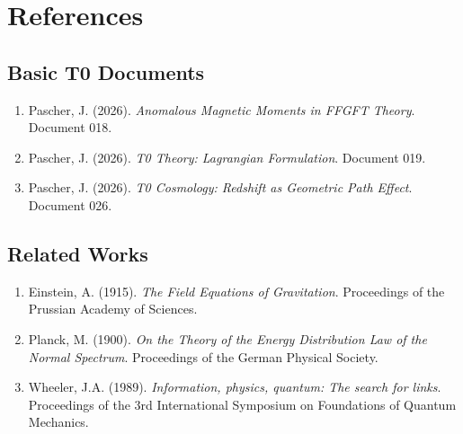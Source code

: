 	\section{References}
	
	\subsection{Basic T0 Documents}
	
	\begin{enumerate}
		\item Pascher, J. (2026). \textit{Anomalous Magnetic Moments in FFGFT Theory}. Document 018.
		\item Pascher, J. (2026). \textit{T0 Theory: Lagrangian Formulation}. Document 019.
		\item Pascher, J. (2026). \textit{T0 Cosmology: Redshift as Geometric Path Effect}. Document 026.
	\end{enumerate}
	
	\subsection{Related Works}
	
	\begin{enumerate}
		\item Einstein, A. (1915). \textit{The Field Equations of Gravitation}. Proceedings of the Prussian Academy of Sciences.
		\item Planck, M. (1900). \textit{On the Theory of the Energy Distribution Law of the Normal Spectrum}. Proceedings of the German Physical Society.
		\item Wheeler, J.A. (1989). \textit{Information, physics, quantum: The search for links}. Proceedings of the 3rd International Symposium on Foundations of Quantum Mechanics.
	\end{enumerate}
	